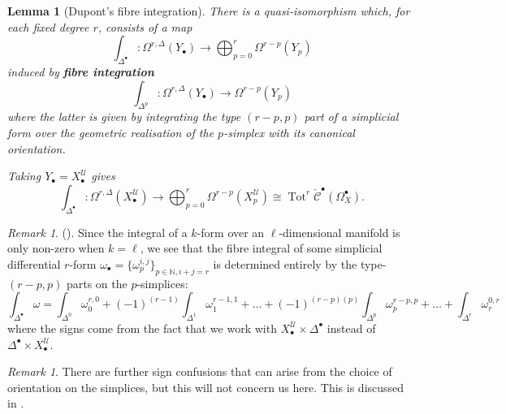 \documentclass[11pt,fleqn]{article}
\theoremstyle{plain}
\newtheorem{lemma}[theorem]{Lemma}
\theoremstyle{definition}
\theoremstyle{remark}
\newtheorem{remark}[theorem]{Remark}
\numberwithin{equation}{theorem}
\newcommand{\cover}{\mathcal{U}}
\newcommand{\cech}{\check{\mathscr{C}}}
\newcommand{\define}[1]{\textbf{#1}}
\newcommand{\nerve}[1]{X_{#1}^\cover}
\DeclareMathOperator{\Tot}{Tot}
\begin{document}
        \begin{lemma}[Dupont's fibre integration]\label{lemma:dupont's-fibre-integration}
            There is a \emph{quasi-isomorphism} which, for each fixed degree $r$, consists of a map
            \begin{equation}
                \int_{\Delta^\bullet}\colon \Omega^{r,\Delta}(Y_\bullet)
                \to
                \bigoplus_{p=0}^r\Omega^{r-p}(Y_p)
            \end{equation}
            induced by \define{fibre integration}
            \begin{equation}
                \int_{\Delta^p}\colon\Omega^{r,\Delta}(Y_\bullet)
                \to
                \Omega^{r-p}(Y_p)
            \end{equation}
            where the latter is given by integrating the type $(r-p,p)$ part of a simplicial form over the geometric realisation of the $p$-simplex with its canonical orientation.

            Taking $Y_\bullet=\nerve{\bullet}$ gives
            \[
                \int_{\Delta^\bullet}\colon \Omega^{r,\Delta}(\nerve{\bullet})
                \to
                \bigoplus_{p=0}^r\Omega^{r-p}(\nerve{p})
                \cong
                \Tot^r\cech^\bullet(\Omega^\bullet_X).
            \]
        \end{lemma}

        \begin{remark}\label{remark:fibre-integration-only-depends-on-certain-parts}
            (\cite[p.~36]{Green1980}).
            Since the integral of a $k$-form over an $\ell$-dimensional manifold is only non-zero when $k=\ell$, we see that the fibre integral of some simplicial differential $r$-form $\omega_\bullet = \{\omega_p^{i,j}\}_{p\in\mathbb{N},i+j=r}$ is determined entirely by the type-$(r-p,p)$ parts on the $p$-simplices:
            \begin{equation*}
                \int_{\Delta^\bullet}\omega = \int_{\Delta^0}\omega_0^{r,0} + (-1)^{(r-1)}\int_{\Delta^1}\omega_1^{r-1,1} + \ldots + (-1)^{(r-p)(p)}\int_{\Delta^p}\omega_p^{r-p,p} + \ldots + \int_{\Delta^r}\omega_r^{0,r}
            \end{equation*}
            where the signs come from the fact that we work with $\nerve{\bullet}\times\Delta^\bullet$ instead of $\Delta^\bullet\times\nerve{\bullet}$.
        \end{remark}

        \begin{remark}
            There are further sign confusions that can arise from the choice of orientation on the simplices, but this will not concern us here.
            This is discussed in \cite{Hosgood2020}.
        \end{remark}
\end{document}
